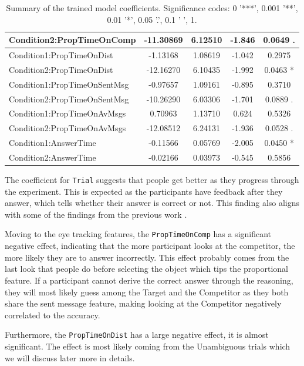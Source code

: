 \begin{table}[h!]
\begin{tabular}{|l|c|c|c|c|}
Condition2:PropTimeOnComp          & -11.30869 & 6.12510 & -1.846 & 0.0649 . \\ \hline
Condition1:PropTimeOnDist           & -1.13168 & 1.08619 & -1.042 & 0.2975 \\ \hline
Condition2:PropTimeOnDist          & -12.16270 & 6.10435 & -1.992 & 0.0463 * \\ \hline
Condition1:PropTimeOnSentMsg        & -0.97657 & 1.09161 & -0.895 & 0.3710 \\ \hline
Condition2:PropTimeOnSentMsg       & -10.26290 & 6.03306 & -1.701 & 0.0889 . \\ \hline
Condition1:PropTimeOnAvMsgs   & 0.70963 & 1.13710 & 0.624 & 0.5326 \\ \hline
Condition2:PropTimeOnAvMsgs & -12.08512 & 6.24131 & -1.936 & 0.0528 . \\ \hline
Condition1:AnswerTime               & -0.11566 & 0.05769 & -2.005 & 0.0450 * \\ \hline
Condition2:AnswerTime               & -0.02166 & 0.03973 & -0.545 & 0.5856 \\ \hline
\end{tabular}
\caption{Summary of the trained model coefficients. Significance codes: 0 '***', 0.001 '**', 0.01 '*', 0.05 '.', 0.1 ' ', 1.}
\label{tab:model_coefficients_acc}
\end{table}

The coefficient for \texttt{Trial} suggests that people get better as they progress through the experiment. This is expected as the participants have feedback after they answer, which tells whether their answer is correct or not. This finding also aligns with some of the findings from the previous work \citep{Mayn_2023, Mayn_2025}. 

Moving to the eye tracking features, the \texttt{PropTimeOnComp} has a significant negative effect, indicating that the more participant looks at the competitor, the more likely they are to answer incorrectly. This effect probably comes from the last look that people do before selecting the object which tips the proportional feature. If a participant cannot derive the correct answer through the reasoning, they will most likely guess among the Target and the Competitor as they both share the sent message feature, making looking at the Competitor negatively correlated to the accuracy.

Furthermore, the \texttt{PropTimeOnDist} has a large negative effect, it is almost significant. The effect is most likely coming from the Unambiguous trials which we will discuss later more in details. 

